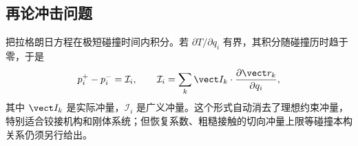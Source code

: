 \subsection{再论冲击问题}

把拉格朗日方程在极短碰撞时间内积分。若 $\partial T/\partial q_i$ 有界，其积分随碰撞历时趋于零，于是
\begin{equation}
 p_i^+-p_i^-=\mathcal I_i,\qquad
 \mathcal I_i=\sum_k\vect I_k\cdot
 \frac{\partial\vect r_k}{\partial q_i},
 \label{r2ch03:eq:030}
\end{equation}
其中 $\vect I_k$ 是实际冲量，$\mathcal I_i$ 是广义冲量。这个形式自动消去了理想约束冲量，特别适合铰接机构和刚体系统；但恢复系数、粗糙接触的切向冲量上限等碰撞本构关系仍须另行给出。
